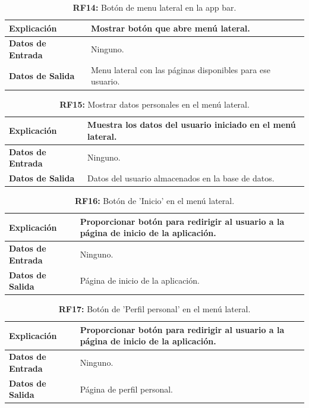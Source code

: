 \documentclass[a4paper, 12pt]{article}
\begin{document}
\begin{table}[H]
\captionsetup{justification=raggedright,singlelinecheck=false}
\caption{\textbf{RF14:} Botón de menu lateral en la app bar.}
\label{tab:RF14}
	\begin{tabular}{|m{5cm}|m{10cm}|}
	\hline
	\textbf{Explicación} & Mostrar botón que abre menú lateral. \\ 
	\hline
	\textbf{Datos de Entrada} & Ninguno. \\ 
	\hline
	\textbf{Datos de Salida} & Menu lateral con las páginas disponibles para ese usuario. \\ 
	\hline
\end{tabular}
\end{table}

\begin{table}[H]
\captionsetup{justification=raggedright,singlelinecheck=false}
\caption{\textbf{RF15:} Mostrar datos personales en el menú lateral.}
\label{tab:RF15}
	\begin{tabular}{|m{5cm}|m{10cm}|}
	\hline
	\textbf{Explicación} & Muestra los datos del usuario iniciado en el menú lateral. \\ 
	\hline
	\textbf{Datos de Entrada} & Ninguno. \\ 
	\hline
	\textbf{Datos de Salida} & Datos del usuario almacenados en la base de datos. \\ 
	\hline
\end{tabular}
\end{table}

\begin{table}[H]
\captionsetup{justification=raggedright,singlelinecheck=false}
\caption{\textbf{RF16:} Botón de 'Inicio' en el menú lateral.}
\label{tab:RF16}
	\begin{tabular}{|m{5cm}|m{10cm}|}
	\hline
	\textbf{Explicación} & Proporcionar botón para redirigir al usuario a la página de inicio de la aplicación. \\ 
	\hline
	\textbf{Datos de Entrada} &  Ninguno. \\ 
	\hline
	\textbf{Datos de Salida} &  Página de inicio de la aplicación. \\ 
	\hline
\end{tabular}
\end{table}

\begin{table}[H]
\captionsetup{justification=raggedright,singlelinecheck=false}
\caption{\textbf{RF17:} Botón de 'Perfil personal' en el menú lateral.}
\label{tab:RF17}
	\begin{tabular}{|m{5cm}|m{10cm}|}
	\hline
	\textbf{Explicación} & Proporcionar botón para redirigir al usuario a la página de inicio de la aplicación. \\ 
	\hline
	\textbf{Datos de Entrada} &  Ninguno. \\ 
	\hline
	\textbf{Datos de Salida} &  Página de perfil personal. \\ 
	\hline
	\hline
\end{tabular}
\end{table}
\end{document}

